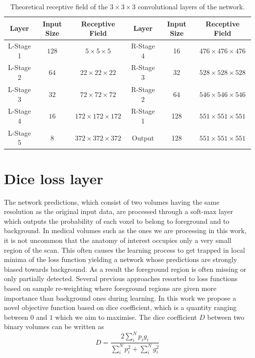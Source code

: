 \begin{table}
\begin{centering}
\protect\caption{Theoretical receptive field of the $3\times3\times3$ convolutional layers of the network.} 
\begin{tabular}{|c|c|c||c|c|c|}
\hline 
Layer & Input Size & Receptive Field & Layer & Input Size & Receptive Field\tabularnewline
\hline 
\hline 
L-Stage 1 & $128$ & $5\times5\times5$ & R-Stage 4 & 16 & $476\times476\times476$\tabularnewline
\hline 
L-Stage 2 & $64$ & $22\times22\times22$ & R-Stage 3 & 32 & $528\times528\times528$\tabularnewline
\hline 
L-Stage 3 & $32$ & $72\times72\times72$ & R-Stage 2 & 64 & $546\times546\times546$\tabularnewline
\hline 
L-Stage 4 & $16$ & $172\times172\times172$ & R-Stage 1 & 128 & $551\times551\times551$\tabularnewline
\hline 
L-Stage 5 & $8$ & $372\times372\times372$ & Output & 128 & \textbf{$551\times551\times551$}\tabularnewline
\hline 
\end{tabular} \label{table:receptiveFields}
\par\end{centering}
\end{table}

\section{Dice loss layer}
The network predictions, which consist of two volumes having the same resolution as the original input data, are processed through a soft-max layer which outputs the probability of each voxel to belong to foreground and to background. In medical volumes such as the ones we are processing in this work, it is not uncommon that the anatomy of interest occupies only a very small region of the scan. This often causes the learning process to get trapped in local minima of the loss function yielding a network whose predictions are strongly biased towards background. As a result the foreground region is often missing or only partially detected. Several previous approaches resorted to loss functions based on sample re-weighting where foreground regions are given more importance than background ones during learning. In this work we propose a novel objective function based on dice coefficient, which is a quantity ranging between $0$ and $1$ which we aim to maximise. The dice coefficient $D$ between two binary volumes can be written as
\[
D=\frac{2\sum_{i}^{N}p_{i}g_{i}}{\sum_{i}^{N}p_{i}^{2}+\sum_{i}^{N}g_{i}^{2}}
\]

